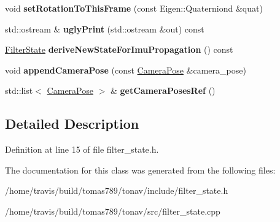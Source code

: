\begin{DoxyCompactItemize}
\item 
\hypertarget{class_filter_state_ae820e97a5a74c7765780bc7bb223796b}{void {\bfseries set\-Rotation\-To\-This\-Frame} (const Eigen\-::\-Quaterniond \&quat)}\label{class_filter_state_ae820e97a5a74c7765780bc7bb223796b}

\item 
\hypertarget{class_filter_state_aed4aab3a5133d37924bc5c1284b6cb66}{std\-::ostream \& {\bfseries ugly\-Print} (std\-::ostream \&out) const }\label{class_filter_state_aed4aab3a5133d37924bc5c1284b6cb66}

\item 
\hypertarget{class_filter_state_af33cfbc67284846e3ca9c26a79c227a9}{\hyperlink{class_filter_state}{Filter\-State} {\bfseries derive\-New\-State\-For\-Imu\-Propagation} () const }\label{class_filter_state_af33cfbc67284846e3ca9c26a79c227a9}

\item 
\hypertarget{class_filter_state_a9fdc71df11cf72369b86be2eaffcea27}{void {\bfseries append\-Camera\-Pose} (const \hyperlink{class_camera_pose}{Camera\-Pose} \&camera\-\_\-pose)}\label{class_filter_state_a9fdc71df11cf72369b86be2eaffcea27}

\item 
\hypertarget{class_filter_state_a0638c19679b93d95f812bd38758f05ca}{std\-::list$<$ \hyperlink{class_camera_pose}{Camera\-Pose} $>$ \& {\bfseries get\-Camera\-Poses\-Ref} ()}\label{class_filter_state_a0638c19679b93d95f812bd38758f05ca}

\end{DoxyCompactItemize}


\subsection{Detailed Description}


Definition at line 15 of file filter\-\_\-state.\-h.



The documentation for this class was generated from the following files\-:\begin{DoxyCompactItemize}
\item 
/home/travis/build/tomas789/tonav/include/filter\-\_\-state.\-h\item 
/home/travis/build/tomas789/tonav/src/filter\-\_\-state.\-cpp\end{DoxyCompactItemize}
